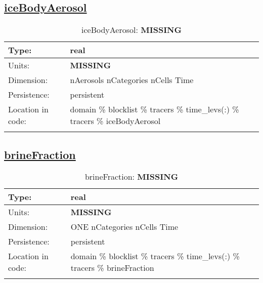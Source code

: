 \subsection[iceBodyAerosol]{\hyperref[sec:var_tab_tracers]{iceBodyAerosol}}
\label{subsec:var_sec_tracers_iceBodyAerosol}
\begin{center}
\begin{longtable}{| p{2.0in} | p{4.0in} |}
        \hline 
        Type: & real \\
        \hline 
        Units: & {\bf \color{red} MISSING} \\
        \hline 
        Dimension: & nAerosols nCategories nCells Time \\
        \hline 
        Persistence: & persistent \\
        \hline 
         Location in code: & domain \% blocklist \% tracers \% time\_levs(:) \% tracers \% iceBodyAerosol \\
         \hline 
    \caption{iceBodyAerosol: {\bf \color{red} MISSING}}
\end{longtable}
\end{center}
\subsection[brineFraction]{\hyperref[sec:var_tab_tracers]{brineFraction}}
\label{subsec:var_sec_tracers_brineFraction}
\begin{center}
\begin{longtable}{| p{2.0in} | p{4.0in} |}
        \hline 
        Type: & real \\
        \hline 
        Units: & {\bf \color{red} MISSING} \\
        \hline 
        Dimension: & ONE nCategories nCells Time \\
        \hline 
        Persistence: & persistent \\
        \hline 
         Location in code: & domain \% blocklist \% tracers \% time\_levs(:) \% tracers \% brineFraction \\
         \hline 
    \caption{brineFraction: {\bf \color{red} MISSING}}
\end{longtable}
\end{center}
